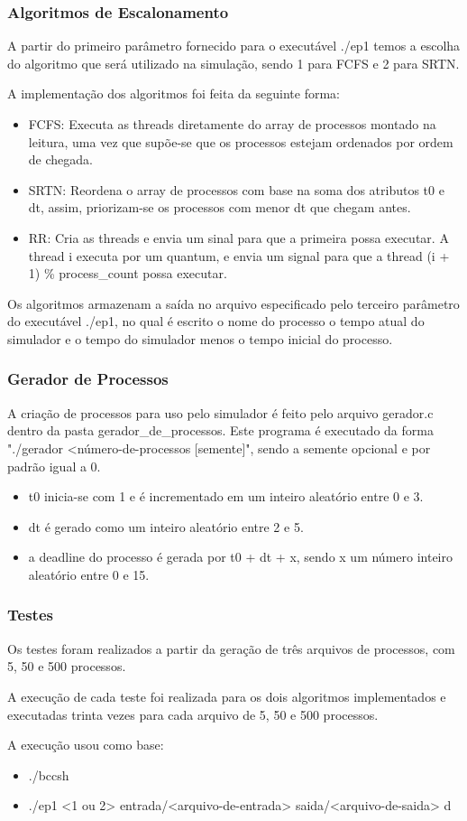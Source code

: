 \documentclass{beamer}
\begin{document}
\begin{frame}
\frametitle{Algoritmos de Escalonamento}
A partir do primeiro parâmetro fornecido para o executável ./ep1 temos a escolha do algoritmo que será utilizado na
    simulação, sendo 1 para FCFS e 2 para SRTN.

A implementação dos algoritmos foi feita da seguinte forma:
\begin{itemize}
    \item FCFS: Executa as threads diretamente do array de processos montado na leitura, uma vez que supõe-se que os processos estejam ordenados por ordem de chegada.
    \item SRTN: Reordena o array de processos com base na soma dos atributos t0 e dt, assim, priorizam-se os processos
        com menor dt que chegam antes.
    \item RR: Cria as threads e envia um sinal para que a primeira possa executar. A thread i executa por um quantum, e envia um signal 
    para que a thread (i + 1) \% process\_count possa executar. 

\end{itemize}

Os algoritmos armazenam a saída no arquivo especificado pelo terceiro parâmetro do executável ./ep1, no qual é escrito o
nome do processo o tempo atual do simulador e o tempo do simulador menos o tempo inicial do processo.

\end{frame}

\begin{frame}
\frametitle{Gerador de Processos}
A criação de processos para uso pelo simulador é feito pelo arquivo gerador.c dentro da pasta gerador\_de\_processos.
    Este programa é executado da forma "./gerador <número-de-processos [semente]", sendo a semente opcional e por
    padrão igual a 0.
\begin{itemize}
    \item t0 inicia-se com 1 e é incrementado em um inteiro aleatório entre 0 e 3.
    \item dt é gerado como um inteiro aleatório entre 2 e 5.
    \item a deadline do processo é gerada por t0 + dt + x, sendo x um número inteiro aleatório entre 0 e 15.
\end{itemize}
\end{frame}

\begin{frame}
\frametitle{Testes}
Os testes foram realizados a partir da geração de três arquivos de processos, com 5, 50 e 500 processos.

A execução de cada teste foi realizada para os dois algoritmos implementados e executadas trinta vezes para cada arquivo
de 5, 50 e 500 processos.

A execução usou como base:
\begin{itemize}
    \item ./bccsh
    \item ./ep1 <1 ou 2> entrada/<arquivo-de-entrada> saida/<arquivo-de-saida> d
\end{itemize}

\end{frame}
\end{document}
